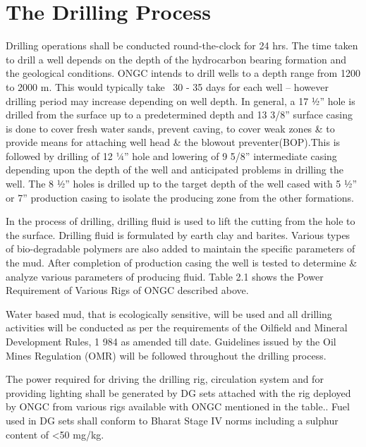 \section*{The Drilling Process}

Drilling operations shall be conducted round-the-clock for 24 hrs. The time taken to drill a
well depends on the depth of the hydrocarbon bearing formation and the geological conditions.
ONGC intends to drill wells to a depth range from 1200 to 2000 m. This would typically take ~30 - 35 days
for each well – however drilling period may increase depending on well depth.
In general, a 17 1⁄2” hole is drilled from the surface up to a predetermined depth and 13 3/8” surface casing is done to cover fresh water sands, prevent caving, to cover weak zones \& to provide means for attaching well head \& the blowout preventer(BOP).This is followed by drilling of 12 1⁄4” hole and lowering of 9 5/8” intermediate casing depending upon the depth of the well and anticipated problems in drilling the well. The 8 1⁄2” holes is drilled up to the target depth of the well cased with 5 1⁄2” or 7” production casing to isolate the producing zone from the other formations.

\vspace{1em}

In the process of drilling, drilling fluid is used to lift the cutting from the hole to the surface.
Drilling fluid is formulated by earth clay and barites. Various types of bio-degradable polymers are
also added to maintain the specific parameters of the mud. After completion of production casing
the well is tested to determine \& analyze various parameters of producing fluid.
Table 2.1 shows the Power Requirement of Various Rigs of ONGC described above.

\vspace{1em}

Water based mud, that is ecologically sensitive, will be used and all drilling activities will
be conducted as per the requirements of the Oilfield and Mineral Development Rules, 1
984 as amended till date. Guidelines issued by the Oil Mines Regulation (OMR) will be followed
throughout the drilling process.

\vspace{1em}
The power required for driving the drilling rig, circulation system and for providing lighting
shall be generated by DG sets attached with the rig deployed by ONGC from various
rigs available with ONGC mentioned in the table.. Fuel used in DG sets shall conform to
Bharat Stage IV norms including a sulphur content of <50 mg/kg.


